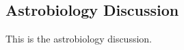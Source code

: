 \subsection{Astrobiology Discussion}
\label{sec:Astrobiology-Discussion}

This is the astrobiology discussion.
